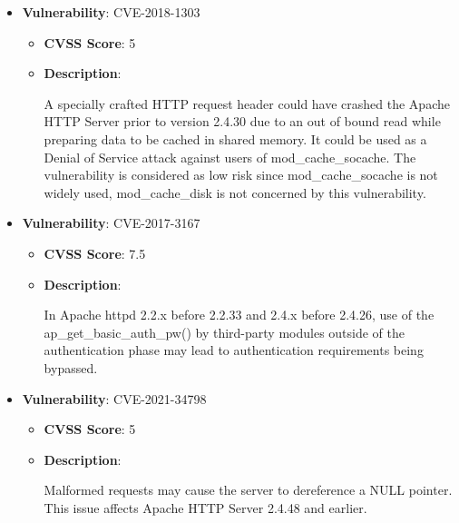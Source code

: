 \documentclass{article}
\begin{document}
\begin{itemize}
        \item \textbf{Vulnerability}: CVE-2018-1303
        \begin{itemize}
            \item \textbf{CVSS Score}:  5 
            \item \textbf{Description}:
            \parbox[t]{0.9\linewidth}{
                \ttfamily A specially crafted HTTP request header could have crashed the Apache HTTP Server prior to version 2.4.30 due to an out of bound read while preparing data to be cached in shared memory. It could be used as a Denial of Service attack against users of mod\_cache\_socache. The vulnerability is considered as low risk since mod\_cache\_socache is not widely used, mod\_cache\_disk is not concerned by this vulnerability.
            }
        \end{itemize}
    
        \item \textbf{Vulnerability}: CVE-2017-3167
        \begin{itemize}
            \item \textbf{CVSS Score}:  7.5 
            \item \textbf{Description}:
            \parbox[t]{0.9\linewidth}{
                \ttfamily In Apache httpd 2.2.x before 2.2.33 and 2.4.x before 2.4.26, use of the ap\_get\_basic\_auth\_pw() by third-party modules outside of the authentication phase may lead to authentication requirements being bypassed.
            }
        \end{itemize}
    
        \item \textbf{Vulnerability}: CVE-2021-34798
        \begin{itemize}
            \item \textbf{CVSS Score}:  5 
            \item \textbf{Description}:
            \parbox[t]{0.9\linewidth}{
                \ttfamily Malformed requests may cause the server to dereference a NULL pointer. This issue affects Apache HTTP Server 2.4.48 and earlier.
            }
        \end{itemize}
    

\end{itemize}
\end{document}
